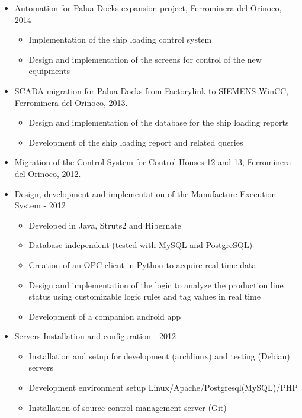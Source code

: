 \documentclass[letterpaper,11pt]{report}
\begin{document}
\begin{itemize}
    \item Automation for Palua Docks expansion project, Ferrominera del Orinoco, 2014
      \begin{itemize}
        \item Implementation of the ship loading control system
        \item Design and implementation of the screens for control of the new equipments
      \end{itemize}
    \item SCADA migration for Palua Docks from Factorylink to SIEMENS WinCC, Ferrominera del Orinoco, 2013.
      \begin{itemize}
        \item Design and implementation of the database for the ship loading reports
        \item Development of the ship loading report and related queries
      \end{itemize}
    \item Migration of the Control System for Control Houses 12 and 13, Ferrominera del Orinoco, 2012.
    \item Design, development and implementation of the Manufacture Execution System - 2012
        \begin{itemize}
        \item Developed in Java, Struts2 and Hibernate
        \item Database independent (tested with MySQL and PostgreSQL)
        \item Creation of an OPC client in Python to acquire real-time data
        \item Design and implementation of the logic to analyze the production line status using customizable logic rules and tag values in real time
        \item Development of a companion android app
        \end{itemize}
    \item Servers Installation and configuration - 2012
        \begin{itemize}
        \item Installation and setup for development (archlinux) and testing (Debian) servers
        \item Development environment setup Linux/Apache/Postgresql(MySQL)/PHP
        \item Installation of source control management server (Git)
        \end{itemize}
  \end{itemize}
\end{document}
